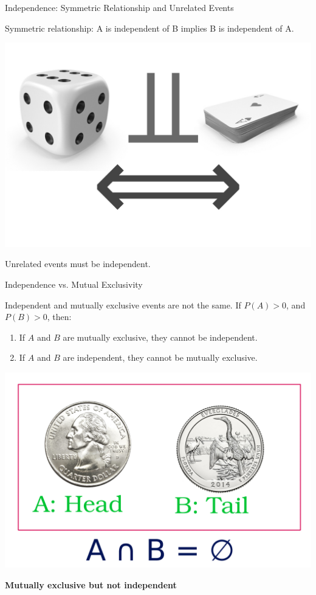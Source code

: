 \documentclass[aspectratio=169,xcolor=dvipsnames,svgnames,x11names,fleqn]{beamer}
\begin{document}
    
    \begin{frame}[containsverbatim]{Independence: Symmetric Relationship and Unrelated Events}
        \large
        \begin{center}
            Symmetric relationship: A is independent of B implies B is independent of A.

            \includegraphics[width=0.4\linewidth]{figures/dice_cards.jpg}

            Unrelated events must be independent.
        \end{center}
    \end{frame}
    
    
    \begin{frame}[containsverbatim]{Independence vs. Mutual Exclusivity}
       
        \begin{center}
            Independent and mutually exclusive events are not the same. If $P(A) > 0$, and $P(B) > 0$, then:
            \begin{enumerate}
                \item If $A$ and $B$ are mutually exclusive, they cannot be independent.
                \item If $A$ and $B$ are independent, they cannot be mutually exclusive.
            \end{enumerate}

            \includegraphics[width=0.4\linewidth]{figures/mutual_exclusive.png}

                \textbf{Mutually exclusive but not independent}
        
            \end{center}
    \end{frame}
    
\end{document}

